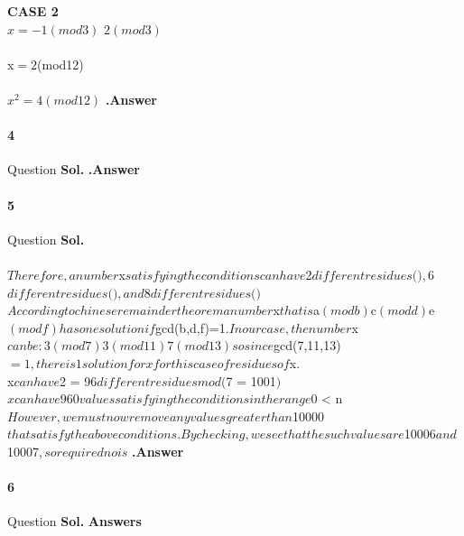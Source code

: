 \documentclass[12pt]{amsart}
\begin{document}
\textbf{CASE 2} \\
\implies $x= -1 (mod 3)$ \equiv$ 2(mod 3)$\\ \\
x$=2$(mod12) \\
\\
\implies $x^{2}= 4(mod 12)$
\textbf{.Answer}

\bigskip
\paragraph*{4} Question
\bigskip
\textbf{Sol.} \textbf{.Answer}


\paragraph*{5} Question
\bigskip
\textbf{Sol.}
 \in {}\ge{}\le{}\\
 \\
$Therefore, a number $x$ satisfying the conditions can have $2$ different residues ($$), $6$ different residues ($$), and $8$ different residues ($$) $\\
$According to chinese remainder theorem a number $x$ that is $a$ (mod b) $c$ (mod d) $e$ (mod f) has one solution if $gcd(b,d,f)=1$.In our case, the number $x$ can be: 3 (mod 7) 3 (mod 11) 7 (mod 13) so since $gcd(7,11,13)$=1, there is 1 solution for x for this case of residues of $x$. $\\
\implies$ $x$ can have $2  = 96$ different residues mod ($7   = 1001$ )$\\
\implies $x can have 960 values satisfying the conditions in the range $0 < n $ $\\
 $However, we must now remove any values greater than $10000$ that satisfy the above conditions. By checking , we see that the such values are $10006$ and $10007$, so required no is $$ $
\textbf{.Answer}
\bigskip
\paragraph*{6} Question
\bigskip
\textbf{Sol.} \textbf{Answers}\\
\end{document}

